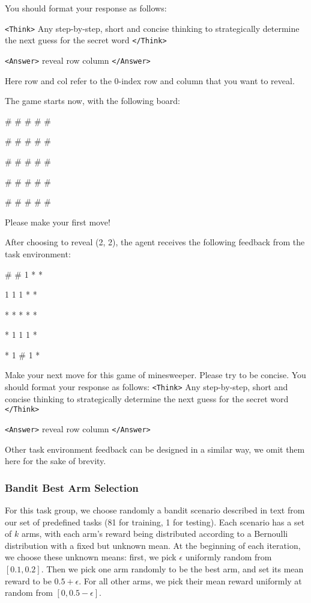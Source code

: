 \begin{tcolorbox}[colback=gray!20, colframe=black, title=Minesweeper Agent Prompt]
You should format your response as follows: 

\texttt{<Think>} Any step-by-step, short and concise thinking to strategically determine the next guess for the secret word \texttt{</Think>} 

\texttt{<Answer>} reveal row column \texttt{</Answer>} 

Here row and col refer to the 0-index row and column that you want to reveal. 

The game starts now, with the following board: 

\# \# \# \# \#

\# \# \# \# \#

\# \# \# \# \#

\# \# \# \# \#

\# \# \# \# \#

Please make your first move!
\end{tcolorbox}

After choosing to reveal (2, 2), the agent receives the following feedback from the task environment:

\begin{tcolorbox}[colback=gray!20, colframe=black, title=Minesweeper Environment Feedback Example]
\# \# 1 * *

1 1 1 * *

* * * * *

* 1 1 1 *

* 1 \# 1 *

Make your next move for this game of minesweeper. Please try to be concise. You should format your response as follows: \texttt{<Think>} Any step-by-step, short and concise thinking to strategically determine the next guess for the secret word \texttt{</Think>} 

\texttt{<Answer>} reveal row column \texttt{</Answer>}
\end{tcolorbox}

Other task environment feedback can be designed in a similar way, we omit them here for the sake of brevity.

\newpage

\subsubsection{Bandit Best Arm Selection}

For this task group, we choose randomly a bandit scenario described in text from our set of predefined tasks (81 for training, 1 for testing). Each scenario has a set of $k$ arms, with each arm's reward being distributed according to a Bernoulli distribution with a fixed but unknown mean. At the beginning of each iteration, we choose these unknown means: first, we pick $\epsilon$ uniformly random from $[0.1, 0.2]$. Then we pick one arm randomly to be the best arm, and set its mean reward to be $0.5 + \epsilon$. For all other arms, we pick their mean reward uniformly at random from $[0, 0.5 - \epsilon]$.

